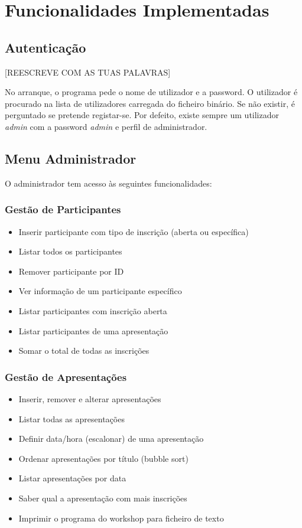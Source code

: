 \documentclass[12pt,a4paper]{article}
\begin{document}
\section{Funcionalidades Implementadas}

\subsection{Autenticação}

[REESCREVE COM AS TUAS PALAVRAS]

No arranque, o programa pede o nome de utilizador e a password. O utilizador é procurado na lista de utilizadores carregada do ficheiro binário. Se não existir, é perguntado se pretende registar-se. Por defeito, existe sempre um utilizador \textit{admin} com a password \textit{admin} e perfil de administrador.

\subsection{Menu Administrador}

O administrador tem acesso às seguintes funcionalidades:

\subsubsection{Gestão de Participantes}
\begin{itemize}
  \item Inserir participante com tipo de inscrição (aberta ou específica)
  \item Listar todos os participantes
  \item Remover participante por ID
  \item Ver informação de um participante específico
  \item Listar participantes com inscrição aberta
  \item Listar participantes de uma apresentação
  \item Somar o total de todas as inscrições
\end{itemize}

\subsubsection{Gestão de Apresentações}
\begin{itemize}
  \item Inserir, remover e alterar apresentações
  \item Listar todas as apresentações
  \item Definir data/hora (escalonar) de uma apresentação
  \item Ordenar apresentações por título (bubble sort)
  \item Listar apresentações por data
  \item Saber qual a apresentação com mais inscrições
  \item Imprimir o programa do workshop para ficheiro de texto
\end{itemize}
\end{document}
